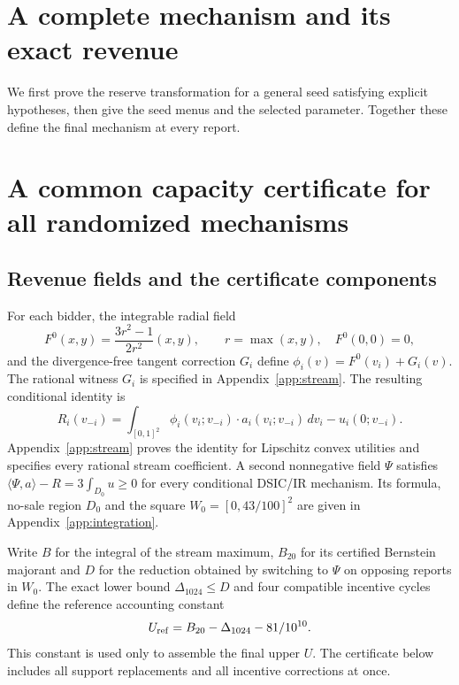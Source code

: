 \documentclass[11pt]{article}
\begin{document}
\section{A complete mechanism and its exact revenue}\label{sec:mechanism}
We first prove the reserve transformation for a general seed satisfying
explicit hypotheses, then give the seed menus and the selected parameter.
Together these define the final mechanism at every report.





\section{A common capacity certificate for all randomized mechanisms}\label{sec:upper}


\subsection{Revenue fields and the certificate components}
For each bidder, the integrable radial field
\[
 F^0(x,y)=\frac{3r^2-1}{2r^2}(x,y),\qquad r=\max(x,y),
 \quad F^0(0,0)=0,
\]
and the divergence-free tangent correction $G_i$ define
$\phi_i(v)=F^0(v_i)+G_i(v)$. The rational witness $G_i$ is specified in
Appendix~\ref{app:stream}. The resulting conditional identity is
\[
 R_i(v_{-i})=\int_{[0,1]^2}\phi_i(v_i;v_{-i})\cdot a_i(v_i;v_{-i})\,dv_i
               -u_i(0;v_{-i}).
\]
Appendix~\ref{app:stream} proves the identity for Lipschitz convex utilities
and specifies every rational stream coefficient. A second nonnegative field
$\Psi$ satisfies $\langle\Psi,a\rangle-R=3\int_{D_0}u\ge0$ for
every conditional DSIC/IR mechanism. Its formula, no-sale region $D_0$ and
the square $W_0=[0,43/100]^2$ are given in Appendix~\ref{app:integration}.

Write $B$ for the integral of the stream maximum, $B_{20}$ for its certified
Bernstein majorant and $D$ for the reduction obtained by switching to $\Psi$
on opposing reports in $W_0$. The exact lower bound $\Delta_{1024}\le D$
and four compatible incentive cycles define the reference accounting constant
\[
 U_{\rm ref}=B_{20}-\Delta_{1024}-81/10^{10}.
\]
This constant is used only to assemble the final upper $U$. The certificate
below includes all support replacements and all incentive corrections at once.


\end{document}
